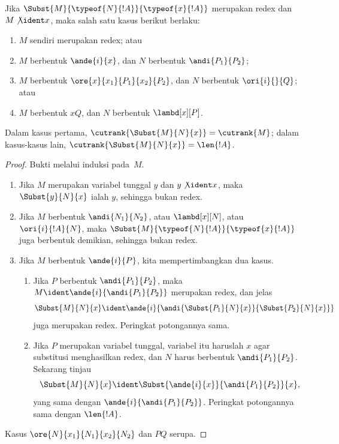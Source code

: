 \documentclass[../../../include/open-logic-section]{subfiles}
\begin{document}
\begin{lem}
  Jika $\Subst{M}{\typeof{N}{!A}}{\typeof{x}{!A}}$ merupakan redex dan
  $M \not\ident x$, maka salah satu kasus berikut berlaku:
  \begin{enumerate}
  \item $M$ sendiri merupakan redex; atau
  \item $M$ berbentuk $\ande{i}{x}$, dan $N$ berbentuk
    $\andi{P_1}{P_2}$;
  \item $M$ berbentuk $\ore{x}{x_1}{P_1}{x_2}{P_2}$, dan $N$ berbentuk
    $\ori{i}{}{Q}$; atau
  \item $M$ berbentuk $x Q$, dan $N$ berbentuk $\lambd[x][P]$.
  \end{enumerate}
  Dalam kasus pertama, $\cutrank{\Subst{M}{N}{x}} = \cutrank{M}$;
  dalam kasus-kasus lain,
  $\cutrank{\Subst{M}{N}{x}} = \len{!A}$.
\end{lem}
\begin{proof}
  Bukti melalui induksi pada~$M$.
  \begin{enumerate}
  \item Jika $M$ merupakan variabel tunggal $y$ dan $y \not\ident x$,
    maka $\Subst{y}{N}{x}$ ialah $y$, sehingga bukan redex.
  \item Jika $M$ berbentuk $\andi{N_1}{N_2}$, atau $\lambd[x][N]$, atau
    $\ori{i}{!A}{N}$, maka
    $\Subst{M}{\typeof{N}{!A}}{\typeof{x}{!A}}$ juga berbentuk demikian,
    sehingga bukan redex.
  \item Jika $M$ berbentuk $\ande{i}{P}$, kita mempertimbangkan dua kasus.
    \begin{enumerate}
      \item Jika $P$ berbentuk $\andi{P_1}{P_2}$, maka $M \ident
        \ande{i}{\andi{P_1}{P_2}}$ merupakan redex, dan jelas
        \[
        \Subst{M}{N}{x} \ident
        \ande{i}{\andi{\Subst{P_1}{N}{x}}{\Subst{P_2}{N}{x}}}
        \]
        juga merupakan redex. Peringkat potongannya sama.
      \item Jika $P$ merupakan variabel tunggal, variabel itu haruslah
        $x$ agar substitusi menghasilkan redex, dan $N$ harus berbentuk
        $\andi{P_1}{P_2}$. Sekarang tinjau
        \[
        \Subst{M}{N}{x} \ident
        \Subst{\ande{i}{x}}{\andi{P_1}{P_2}}{x},
        \]
        yang sama dengan $\ande{i}{\andi{P_1}{P_2}}$. Peringkat
        potongannya sama dengan $\len{!A}$.
    \end{enumerate}
  \end{enumerate}
  Kasus $\ore{N}{x_1}{N_1}{x_2}{N_2}$ dan $P Q$ serupa.
\end{proof}
\end{document}
